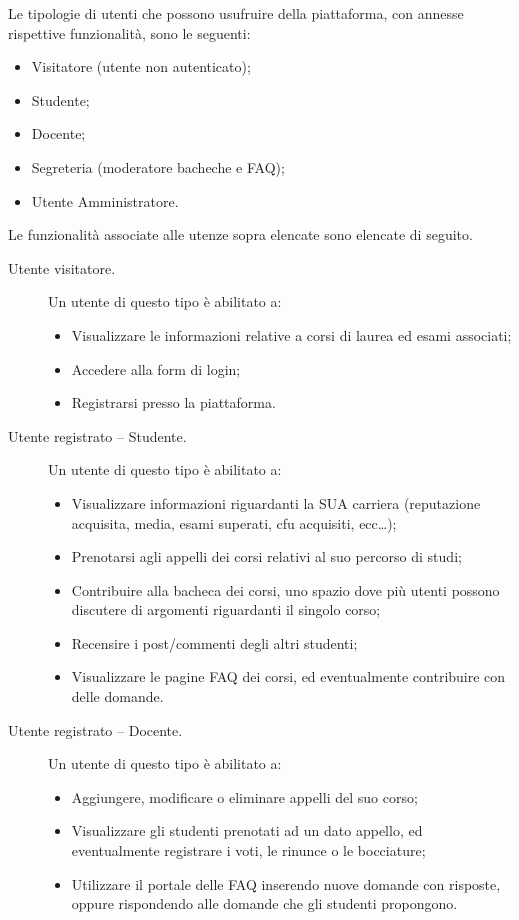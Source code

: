 \documentclass [a4paper,11pt]{book}
\begin{document}
Le tipologie di utenti che possono usufruire della piattaforma, con annesse rispettive funzionalità, sono le seguenti:
\begin{itemize}
\item Visitatore (utente non autenticato);
\item Studente;
\item Docente;
\item Segreteria (moderatore bacheche e FAQ);
\item Utente Amministratore.
\end{itemize}

\medskip
\medskip
\medskip

Le funzionalità associate alle utenze sopra elencate sono elencate di seguito.
\begin{description}
\item[Utente visitatore.] Un utente di questo tipo è abilitato a:

\begin{itemize}
\item Visualizzare le informazioni relative a corsi di laurea ed esami associati;
\item Accedere alla form di login;
\item Registrarsi presso la piattaforma.
\end{itemize}

\item[Utente registrato – Studente.] Un utente di questo tipo è abilitato a:

\begin{itemize}
\item Visualizzare informazioni riguardanti la SUA carriera (reputazione acquisita, media, esami superati, cfu acquisiti, ecc…);
\item Prenotarsi agli appelli dei corsi relativi al suo percorso di studi;
\item Contribuire alla bacheca dei corsi, uno spazio dove più utenti possono discutere di argomenti riguardanti il singolo corso;
\item Recensire i post/commenti degli altri studenti;
\item Visualizzare le pagine FAQ dei corsi, ed eventualmente contribuire con delle domande.
\end{itemize}

\item[Utente registrato – Docente.] Un utente di questo tipo è abilitato a:

\begin{itemize}
\item Aggiungere, modificare o eliminare appelli del suo corso;	%
\item Visualizzare gli studenti prenotati ad un dato appello, ed eventualmente registrare i voti, le rinunce o le bocciature;
\item Utilizzare il portale delle FAQ inserendo nuove domande con risposte, oppure rispondendo alle domande che gli studenti propongono.	%
\end{itemize}


\end{description}
\end{document}
